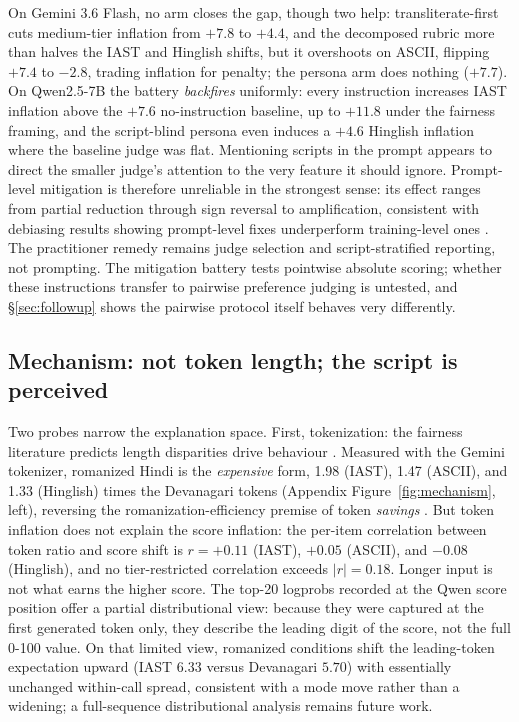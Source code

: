 On Gemini 3.6 Flash, no arm closes the gap, though two help: transliterate-first cuts medium-tier inflation from $+7.8$ to $+4.4$, and the decomposed rubric more than halves the IAST and Hinglish shifts, but it overshoots on ASCII, flipping $+7.4$ to $-2.8$, trading inflation for penalty; the persona arm does nothing ($+7.7$). On Qwen2.5-7B the battery \emph{backfires} uniformly: every instruction increases IAST inflation above the $+7.6$ no-instruction baseline, up to $+11.8$ under the fairness framing, and the script-blind persona even induces a $+4.6$ Hinglish inflation where the baseline judge was flat. Mentioning scripts in the prompt appears to direct the smaller judge's attention to the very feature it should ignore. Prompt-level mitigation is therefore unreliable in the strongest sense: its effect ranges from partial reduction through sign reversal to amplification, consistent with debiasing results showing prompt-level fixes underperform training-level ones \citep{zhou2026judgebiasbench}. The practitioner remedy remains judge selection and script-stratified reporting, not prompting. The mitigation battery tests pointwise absolute scoring; whether these instructions transfer to pairwise preference judging is untested, and \S\ref{sec:followup} shows the pairwise protocol itself behaves very differently.

\subsection{Mechanism: not token length; the script is perceived}
\label{sec:mechanism}

Two probes narrow the explanation space. First, tokenization: the fairness literature predicts length disparities drive behaviour \citep{petrov2023tokenizers, ahia2023costs, srivastava2026tokenizertax}. Measured with the Gemini tokenizer, romanized Hindi is the \emph{expensive} form, 1.98 (IAST), 1.47 (ASCII), and 1.33 (Hinglish) times the Devanagari tokens (Appendix Figure~\ref{fig:mechanism}, left), reversing the romanization-efficiency premise of token \emph{savings} \citep{husain2024romansetu, brahma2025morphtok}. But token inflation does not explain the score inflation: the per-item correlation between token ratio and score shift is $r = +0.11$ (IAST), $+0.05$ (ASCII), and $-0.08$ (Hinglish), and no tier-restricted correlation exceeds $|r| = 0.18$. Longer input is not what earns the higher score. The top-20 logprobs recorded at the Qwen score position offer a partial distributional view: because they were captured at the first generated token only, they describe the leading digit of the score, not the full 0-100 value. On that limited view, romanized conditions shift the leading-token expectation upward (IAST $6.33$ versus Devanagari $5.70$) with essentially unchanged within-call spread, consistent with a mode move rather than a widening; a full-sequence distributional analysis remains future work.

